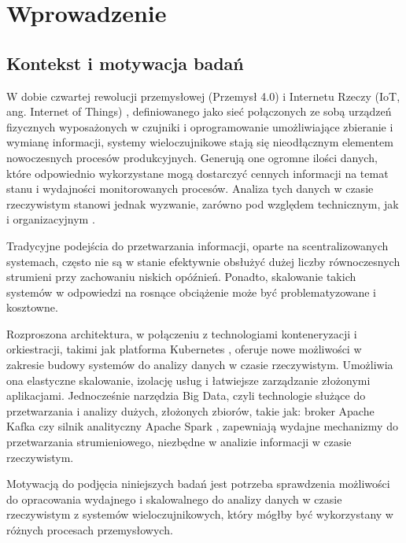 \section{Wprowadzenie}
\label{sec:wprowadzenie}

\subsection{Kontekst i motywacja badań}
\label{subsec:kontekst}

W dobie czwartej rewolucji przemysłowej (Przemysł 4.0) \cite{przemysl40_iot_ogolnie} i Internetu Rzeczy (IoT, ang. Internet of Things) \cite{iot_definition_aws}, definiowanego jako sieć połączonych ze sobą urządzeń fizycznych wyposażonych w czujniki i oprogramowanie umożliwiające zbieranie i wymianę informacji, systemy wieloczujnikowe stają się nieodłącznym 
elementem nowoczesnych procesów produkcyjnych. Generują one ogromne ilości danych, które odpowiednio wykorzystane mogą dostarczyć
cennych informacji na temat stanu i wydajności monitorowanych procesów. Analiza tych danych w czasie rzeczywistym stanowi jednak
wyzwanie, zarówno pod względem technicznym, jak i organizacyjnym \cite{realtime_challenges}.

Tradycyjne podejścia do przetwarzania informacji, oparte na scentralizowanych systemach, często nie są w stanie efektywnie obsłużyć
dużej liczby równoczesnych strumieni przy zachowaniu niskich opóźnień. Ponadto, skalowanie takich systemów w odpowiedzi na rosnące
obciążenie może być problematyzowane i kosztowne.

Rozproszona architektura, w połączeniu z technologiami konteneryzacji i orkiestracji, takimi jak platforma Kubernetes \cite{kubernetes_benefits},
oferuje nowe możliwości w zakresie budowy systemów do analizy danych w czasie rzeczywistym. Umożliwia ona elastyczne skalowanie,
izolację usług i łatwiejsze zarządzanie złożonymi aplikacjami. Jednocześnie narzędzia Big Data, czyli technologie służące do przetwarzania i analizy dużych, złożonych zbiorów, takie jak: broker Apache Kafka czy silnik analityczny Apache Spark \cite{kafka, spark_streaming}, zapewniają
wydajne mechanizmy do przetwarzania strumieniowego, niezbędne w analizie informacji w czasie rzeczywistym.

Motywacją do podjęcia niniejszych badań jest potrzeba sprawdzenia możliwości do opracowania wydajnego i skalowalnego do
analizy danych w czasie rzeczywistym z systemów wieloczujnikowych, który mógłby być wykorzystany w różnych procesach przemysłowych.

